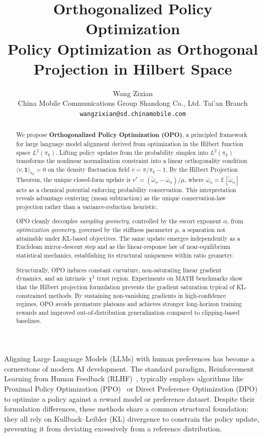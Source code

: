 \documentclass[11pt]{article}
\title{\textbf{Orthogonalized Policy Optimization}\\
\large Policy Optimization as Orthogonal Projection in Hilbert Space}
\author{Wang Zixian\\
\small China Mobile Communications Group Shandong Co., Ltd. Tai'an Branch\\
\small \texttt{wangzixian@sd.chinamobile.com}}
\date{}
\theoremstyle{definition}
\theoremstyle{remark}
\begin{document}
\maketitle

\begin{abstract}
We propose \textbf{Orthogonalized Policy Optimization (OPO)}, a principled framework for large language model alignment derived from optimization in the Hilbert function space $L^2(\pi_k)$. Lifting policy updates from the probability simplex into $L^2(\pi_k)$ transforms the nonlinear normalization constraint into a linear orthogonality condition $\langle v, \mathbf{1} \rangle_{\pi_k} = 0$ on the density fluctuation field $v = \pi/\pi_k - 1$. By the Hilbert Projection Theorem, the unique closed-form update is 
$v^* = (\tilde{\omega}_\alpha - \bar{\omega}_\alpha)/\mu$, 
where $\bar{\omega}_\alpha = \mathbb{E}[\tilde{\omega}_\alpha]$ acts as a chemical potential enforcing probability conservation. This interpretation reveals advantage centering (mean subtraction) as the unique conservation-law projection rather than a variance-reduction heuristic.

OPO cleanly decouples \emph{sampling geometry}, controlled by the escort exponent $\alpha$, from \emph{optimization geometry}, governed by the stiffness parameter $\mu$, a separation not attainable under KL-based objectives. The same update emerges independently as a Euclidean mirror-descent step and as the linear-response law of near-equilibrium statistical mechanics, establishing its structural uniqueness within ratio geometry.

Structurally, OPO induces constant curvature, non-saturating linear gradient dynamics, and an intrinsic $\chi^2$ trust region. Experiments on MATH benchmarks show that the Hilbert projection formulation prevents the gradient saturation typical of KL-constrained methods. By sustaining non-vanishing gradients in high-confidence regimes, OPO avoids premature plateaus and achieves stronger long-horizon training rewards and improved out-of-distribution generalization compared to clipping-based baselines.
\end{abstract}

Aligning Large Language Models (LLMs) with human preferences has become a cornerstone of modern AI development. The standard paradigm, Reinforcement Learning from Human Feedback (RLHF)~\cite{Christiano2017RLHF,Ouyang2022InstructGPT}, typically employs algorithms like Proximal Policy Optimization (PPO)~\cite{Schulman2017PPO} or Direct Preference Optimization (DPO)~\cite{Rafailov2023DPO} to optimize a policy against a reward model or preference dataset. Despite their formulation differences, these methods share a common structural foundation: they all rely on Kullback--Leibler (KL) divergence to constrain the policy update, preventing it from deviating excessively from a reference distribution.
\end{document}
